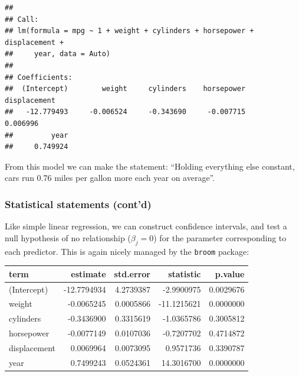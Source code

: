 \documentclass[]{article}
\newenvironment{Shaded}{\begin{snugshade}}{\end{snugshade}}
\newcommand{\KeywordTok}[1]{\textcolor[rgb]{0.13,0.29,0.53}{\textbf{{#1}}}}
\newcommand{\StringTok}[1]{\textcolor[rgb]{0.31,0.60,0.02}{{#1}}}
\newcommand{\NormalTok}[1]{{#1}}
\theoremstyle{definition}
\theoremstyle{definition}
\theoremstyle{remark}
\begin{document}
\begin{verbatim}
## 
## Call:
## lm(formula = mpg ~ 1 + weight + cylinders + horsepower + displacement + 
##     year, data = Auto)
## 
## Coefficients:
##  (Intercept)        weight     cylinders    horsepower  displacement  
##   -12.779493     -0.006524     -0.343690     -0.007715      0.006996  
##         year  
##     0.749924
\end{verbatim}

From this model we can make the statement: ``Holding everything else
constant, cars run 0.76 miles per gallon more each year on average''.

\subsubsection{Statistical statements
(cont'd)}\label{statistical-statements-contd}

Like simple linear regression, we can construct confidence intervals,
and test a null hypothesis of no relationship (\(\beta_j=0\)) for the
parameter corresponding to each predictor. This is again nicely managed
by the \texttt{broom} package:

\begin{Shaded}
\end{Shaded}

\begin{tabular}{l|r|r|r|r}
\hline
term & estimate & std.error & statistic & p.value\\
\hline
(Intercept) & -12.7794934 & 4.2739387 & -2.9900975 & 0.0029676\\
\hline
weight & -0.0065245 & 0.0005866 & -11.1215621 & 0.0000000\\
\hline
cylinders & -0.3436900 & 0.3315619 & -1.0365786 & 0.3005812\\
\hline
horsepower & -0.0077149 & 0.0107036 & -0.7207702 & 0.4714872\\
\hline
displacement & 0.0069964 & 0.0073095 & 0.9571736 & 0.3390787\\
\hline
year & 0.7499243 & 0.0524361 & 14.3016700 & 0.0000000\\
\hline
\end{tabular}
\end{document}
